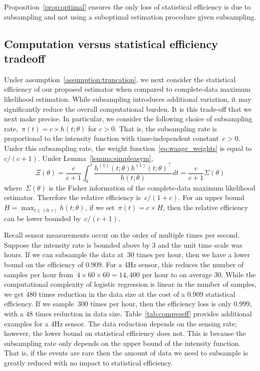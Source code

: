 \documentclass[11pt]{amsart}
\begin{document}
\noindent Proposition~\ref{prop:optimal} ensures the only loss of
statistical efficiency is due to subsampling and not using a
suboptimal estimation procedure given subsampling.

\subsection{Computation versus statistical efficiency tradeoff}

Under assumption~\ref{assumption:truncation}, we next consider the
statistical efficiency of our proposed estimator when compared to
complete-data maximum likelihood estimation.
While subsampling introduces additional variation, it may
significantly reduce the overall computational burden. It is this
trade-off that we next make precise.
In particular, we consider the following choice of subsampling
rate,~$\pi(t) = c \times h(t; \theta)$ for $c>0$. That is, the
subsampling rate is proportional to the intensity function with
time-independent constant~$c > 0$.
Under this subsampling rate, the weight
function~\eqref{eq:waage_weights} is equal to $c / (c+1)$.  
Under Lemma~\ref{lemma:simpleasym}, 
\[
\Xi (\theta) = \frac{c}{c+1} \int_0^\tau \frac{ h^{(1)} (t; \theta)
  h^{(1)} (t; \theta)^\top}{h (t; \theta)} dt = \frac{c}{c+1} \Sigma (\theta)
\]
where~$\Sigma(\theta)$ is the Fisher information of the complete-data 
maximum likelihood estimator.
Therefore the relative efficiency is~$c/(1+c)$. For an upper bound~$H
= \max_{t \in (0,\tau)} h(t;\theta)$, if we set~$\pi (t) = c \times
H$, then the relative efficiency can be lower bounded by~$c / (c+1)$.

Recall sensor measurements occur on the order of multiple times per
second.  Suppose the intensity rate is bounded above by $3$ and the
unit time scale was hours. If we can subsample the data at~$30$
times per hour, then we have a lower bound on the efficiency of
$0.909$. For a 4Hz sensor, this reduces the number of samples per hour
from~$4 \times 60 \times 60 = 14,400$ per hour to on average $30$.
While the computational complexity of logistic regression is linear in
the number of samples, we get $480$ times reduction in the data size
at the cost of a $0.909$ statistical efficiency. If we sample~$300$
times per hour, then the efficiency loss is only $0.999$, with a $48$
times reduction in data size. Table~\ref{tab:compvseff} provides
additional examples for a 4Hz sensor.  The data reduction depends on
the sensing rate; however, the lower bound on statistical efficiency
does not.  This is because the subsampling rate only depends on the
upper bound of the intensity function. That is, if the events are rare
then the amount of data we need to subsample is greatly reduced with
no impact to statistical efficiency.
\end{document}
